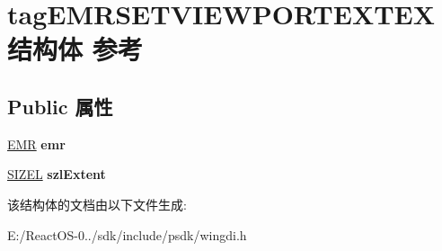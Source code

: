 \hypertarget{structtag_e_m_r_s_e_t_v_i_e_w_p_o_r_t_e_x_t_e_x}{}\section{tag\+E\+M\+R\+S\+E\+T\+V\+I\+E\+W\+P\+O\+R\+T\+E\+X\+T\+E\+X结构体 参考}
\label{structtag_e_m_r_s_e_t_v_i_e_w_p_o_r_t_e_x_t_e_x}
\subsection*{Public 属性}
\begin{DoxyCompactItemize}
\item 
\mbox{\label{structtag_e_m_r_s_e_t_v_i_e_w_p_o_r_t_e_x_t_e_x_a1373a3a48967bf1242a75ef827a82829}} 
\hyperlink{structtag_e_m_r}{E\+MR} {\bfseries emr}
\item 
\mbox{\label{structtag_e_m_r_s_e_t_v_i_e_w_p_o_r_t_e_x_t_e_x_abf1ba3e70ae64b7648c3bee6f570086f}} 
\hyperlink{structtag_s_i_z_e}{S\+I\+Z\+EL} {\bfseries szl\+Extent}
\end{DoxyCompactItemize}


该结构体的文档由以下文件生成\+:\begin{DoxyCompactItemize}
\item 
E\+:/\+React\+O\+S-\/0../sdk/include/psdk/wingdi.\+h\end{DoxyCompactItemize}
